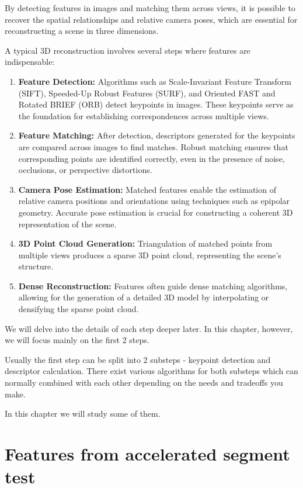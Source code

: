 \documentclass[11pt]{book}
\begin{document}
By detecting features in images and matching them across views, it is possible to recover the spatial relationships and relative camera poses, which are essential for reconstructing a scene in three dimensions.

A typical 3D reconstruction involves several steps where features are indispensable:

\begin{enumerate}
 \item \textbf{Feature Detection:} Algorithms such as Scale-Invariant Feature Transform (SIFT), Speeded-Up Robust Features (SURF), and Oriented FAST and Rotated BRIEF (ORB) detect keypoints in images. These keypoints serve as the foundation for establishing correspondences across multiple views.
 \item \textbf{Feature Matching:} After detection, descriptors generated for the keypoints are compared across images to find matches. Robust matching ensures that corresponding points are identified correctly, even in the presence of noise, occlusions, or perspective distortions.
\item \textbf{Camera Pose Estimation:} Matched features enable the estimation of relative camera positions and orientations using techniques such as epipolar geometry. Accurate pose estimation is crucial for constructing a coherent 3D representation of the scene.
\item \textbf{3D Point Cloud Generation:} Triangulation of matched points from multiple views produces a sparse 3D point cloud, representing the scene's structure.
\item \textbf{Dense Reconstruction:} Features often guide dense matching algorithms, allowing for the generation of a detailed 3D model by interpolating or densifying the sparse point cloud.
 \end{enumerate}

 We will delve into the details of each step deeper later. In this chapter, however, we will focus mainly on the first 2 steps.
 
 Usually the first step can be split into 2 substeps - keypoint detection and descriptor calculation. There exist various algorithms for both substeps which can normally combined with each other depending on the needs and tradeoffs you make. 
 
 In this chapter we will study some of them.
 
 \section{Features from accelerated segment test }

\backmatter
\end{document}
